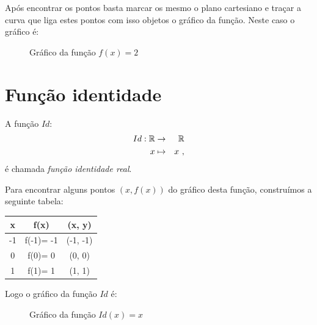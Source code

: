 Após encontrar os pontos basta marcar os mesmo o plano cartesiano e traçar a curva que liga estes pontos com isso objetos o gráfico da função. Neste caso o gráfico é:
\begin{figure}[H]
 \centering
    \caption{Gráfico da função $f(x)=2$}
  \end{figure}

\section{Função identidade}

A função $Id$:
\begin{eqnarray*}
 Id: \mathbb{R} & \rightarrow & \mathbb{R} \\
 x & \mapsto & x \ ,
\end{eqnarray*}
é chamada \textit{função identidade real}.

Para encontrar alguns pontos $(x, f(x))$ do gráfico desta função, construímos a seguinte tabela:

 \begin{table}[H]
 \centering
 \begin{tabular}{|c|c|c|} \hline
 \rowcolor{gray}
  x & f(x) & (x, y)  \\\hline
  -1 & f(-1)= -1 & (-1, -1) \\\hline
   0 & f(0)= 0 & (0, 0)  \\\hline
   1 & f(1)= 1 & (1, 1) \\\hline
 \end{tabular}
\end{table}

Logo o gráfico da função $Id$ é:
\begin{figure}[H]
 \centering
    \caption{Gráfico da função $Id(x)=x$}
  \end{figure}


